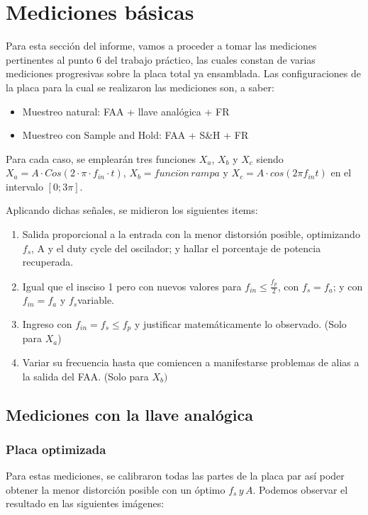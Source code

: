 \documentclass[../../ASSD_TP1_G7.tex]{subfiles}
\begin{document}
\chapter*{Mediciones b\'asicas}

Para esta sección del informe, vamos a proceder a tomar las mediciones
pertinentes al punto 6 del trabajo práctico, las cuales constan de
varias mediciones progresivas sobre la placa total ya ensamblada.
Las configuraciones de la placa para la cual se realizaron las mediciones
son, a saber:
\begin{itemize}
\item Muestreo natural: FAA + llave analógica + FR~
\item Muestreo con Sample and Hold: FAA + S\&H + FR
\end{itemize}
Para cada caso, se emplearán tres funciones $X_{a}$, $X_{b}$ y $X_{c}$
siendo $X_{a}=A\cdot Cos(2\cdot\pi\cdot f_{in}\cdot t)$, $X_{b}=funci\acute{o}n\,rampa$
y $X_{c}=A\cdot cos(2\pi f_{in}t)$ en el intervalo $[0;3\pi].$

Aplicando dichas señales, se midieron los siguientes items:
\begin{enumerate}
\item Salida proporcional a la entrada con la menor distorsión posible,
optimizando $f_{s}$, A y el duty cycle del oscilador; y hallar el
porcentaje de potencia recuperada.
\item Igual que el insciso 1 pero con nuevos valores para $f_{in}\leq\frac{f_{p}}{2}$,
con $f_{s}=f_{a}$; y con $f_{in}=f_{a}$ y $f_{s}$variable.
\item Ingreso con $f_{in}=f_{s}\leq f_{p}$ y justificar matemáticamente
lo observado. (Solo para $X_{a}$)
\item Variar su frecuencia hasta que comiencen a manifestarse problemas
de alias a la salida del FAA. (Solo para $X_{b})$
\end{enumerate}

\section{Mediciones con la llave analógica}

\subsection{Placa optimizada}

Para estas mediciones, se calibraron todas las partes de la placa
par así poder obtener la menor distorción posible con un óptimo $f_{s}\,y\,A$.
Podemos observar el resultado en las siguientes imágenes:
\end{document}
